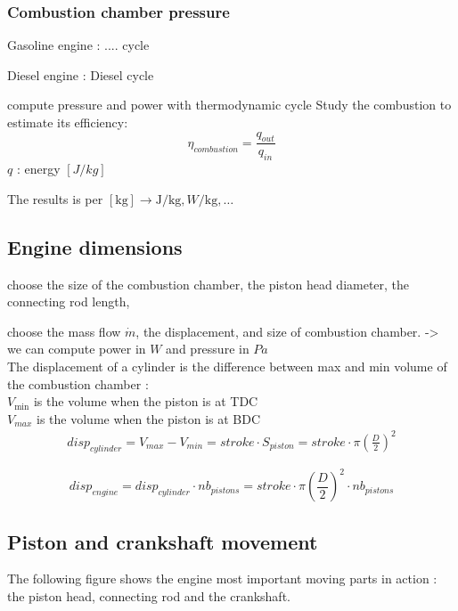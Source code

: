 \documentclass[12pt,a4paper]{article}
\begin{document}
	\subsubsection{Combustion chamber pressure}
	Gasoline engine : .... cycle
	
	Diesel engine : Diesel cycle
	
	compute pressure and power with thermodynamic cycle
	Study the combustion to estimate its efficiency:
	\begin{equation*}
		\eta_{combustion}=\frac{q_{out}}{q_{in}} \tag{1}
	\end{equation*}	
	$q$ : energy $[J / kg]$
	
	The results is per $[\mathrm{kg}] \rightarrow \mathrm{J} / \mathrm{kg}, W / \mathrm{kg}, \ldots$\\
	
	\subsection{Engine dimensions}
	choose the size of the combustion chamber, the piston head diameter, the connecting rod length, 
	
	choose the mass flow $\dot{m}$, the displacement, and size of combustion chamber. -> we can compute power in $W$ and pressure in $Pa$\\
	The displacement of a cylinder is the difference between max and min volume of the combustion chamber : \\
	$V_{\min}$ is the volume when the piston is at TDC\\
	$V_{max}$ is the volume when the piston is at BDC\\
	\begin{eqnarray}
		disp_{cylinder} = V_{max} - V_{min} = stroke \cdot S_{piston} = stroke \cdot \pi (\frac{D}{2})^2 
	\end{eqnarray}
	
	\begin{equation}
		disp_{engine} = disp_{cylinder} \cdot nb_{pistons} = stroke \cdot \pi (\frac{D}{2})^2 \cdot nb_{pistons}
	\end{equation}
	
	
	\subsection{Piston and crankshaft movement}
	The following figure shows the engine most important moving parts in action : the piston head, connecting rod and the crankshaft. \\
\end{document}
